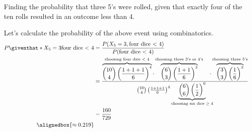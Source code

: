 \documentclass[hwnumber=4,studentnumber=20053722]{mthe353answer}
\begin{document}
\begin{questions}
\begin{parts}
      \part{}
      Finding the probability that three 5's were rolled, given that exactly
      four of the ten rolls resulted in an outcome less than 4.
      \begin{solution}
        Let's calculate the probability of the above event using combinatorics.
        \begin{align*}
          P\giventhat*{X_5=3}{\text{four dice \(<\) 4}} &=
            \frac{
              P(X_5=3, \text{four dice \(<\) 4})
            }{
              P(\text{four dice \(<\) 4})
            }\\
          &= \frac{
              \overbrace{\binom{10}{4}\left(\frac{1+1+1}{6}\right)^4}
                ^{\text{choosing four dice \(<\) 4}} \cdot
              \overbrace{\binom{6}{3}\left(\frac{1+1}{6}\right)^3}
                ^{\text{choosing three 3's or 4's}}
              \quad \cdot \overbrace{\binom{3}{3}\left(\frac{1}{6}\right)^3}
                ^{\text{choosing three 5's}}
            }{
              \binom{10}{4}\left(\frac{1+1+1}{6}\right)^4
              \underbrace{\binom{6}{6}\left(\frac{1}{2}\right)^6}
                _{\text{choosing six dice \(\ge 4\)}}
            }\\
          &= \frac{160}{729}\\
          \alignedbox{\approx 0.219}
        \end{align*}
      \end{solution}
    \end{parts}
  \end{questions}
\end{document}

